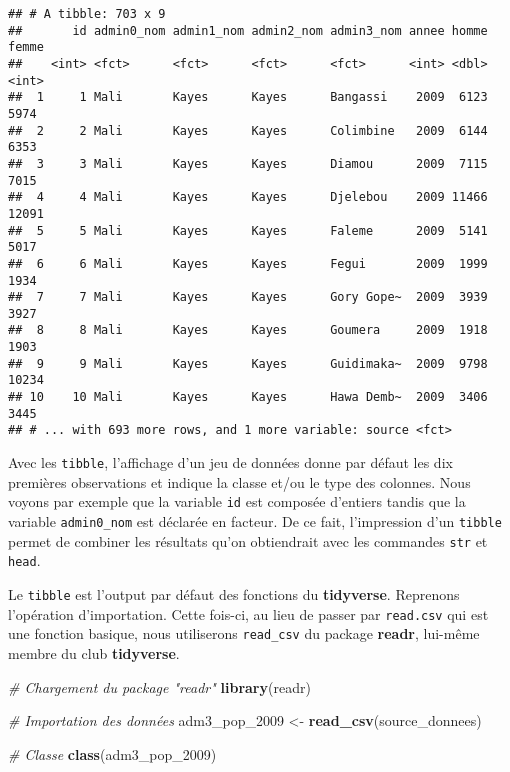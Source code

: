 \documentclass[]{book}
\newenvironment{Shaded}{\begin{snugshade}}{\end{snugshade}}
\newcommand{\KeywordTok}[1]{\textcolor[rgb]{0.13,0.29,0.53}{\textbf{#1}}}
\newcommand{\DecValTok}[1]{\textcolor[rgb]{0.00,0.00,0.81}{#1}}
\newcommand{\StringTok}[1]{\textcolor[rgb]{0.31,0.60,0.02}{#1}}
\newcommand{\CommentTok}[1]{\textcolor[rgb]{0.56,0.35,0.01}{\textit{#1}}}
\newcommand{\NormalTok}[1]{#1}
\begin{document}
\begin{verbatim}
## # A tibble: 703 x 9
##       id admin0_nom admin1_nom admin2_nom admin3_nom annee homme femme
##    <int> <fct>      <fct>      <fct>      <fct>      <int> <dbl> <int>
##  1     1 Mali       Kayes      Kayes      Bangassi    2009  6123  5974
##  2     2 Mali       Kayes      Kayes      Colimbine   2009  6144  6353
##  3     3 Mali       Kayes      Kayes      Diamou      2009  7115  7015
##  4     4 Mali       Kayes      Kayes      Djelebou    2009 11466 12091
##  5     5 Mali       Kayes      Kayes      Faleme      2009  5141  5017
##  6     6 Mali       Kayes      Kayes      Fegui       2009  1999  1934
##  7     7 Mali       Kayes      Kayes      Gory Gope~  2009  3939  3927
##  8     8 Mali       Kayes      Kayes      Goumera     2009  1918  1903
##  9     9 Mali       Kayes      Kayes      Guidimaka~  2009  9798 10234
## 10    10 Mali       Kayes      Kayes      Hawa Demb~  2009  3406  3445
## # ... with 693 more rows, and 1 more variable: source <fct>
\end{verbatim}

Avec les \texttt{tibble}, l'affichage d'un jeu de données donne par
défaut les dix premières observations et indique la classe et/ou le type
des colonnes. Nous voyons par exemple que la variable \texttt{id} est
composée d'entiers tandis que la variable \texttt{admin0\_nom} est
déclarée en facteur. De ce fait, l'impression d'un \texttt{tibble}
permet de combiner les résultats qu'on obtiendrait avec les commandes
\texttt{str} et \texttt{head}.

Le \texttt{tibble} est l'output par défaut des fonctions du
\textbf{tidyverse}. Reprenons l'opération d'importation. Cette fois-ci,
au lieu de passer par \texttt{read.csv} qui est une fonction basique,
nous utiliserons \texttt{read\_csv} du package \textbf{readr}, lui-même
membre du club \textbf{tidyverse}.

\begin{Shaded}
\begin{Highlighting}[]
\CommentTok{# Chargement du package "readr"}
\KeywordTok{library}\NormalTok{(readr)}

\CommentTok{# Importation des données}
\NormalTok{adm3_pop_}\DecValTok{2009}\NormalTok{ <-}\StringTok{ }\KeywordTok{read_csv}\NormalTok{(source_donnees)}

\CommentTok{# Classe}
\KeywordTok{class}\NormalTok{(adm3_pop_}\DecValTok{2009}\NormalTok{)}
\end{Highlighting}
\end{Shaded}
\end{document}

